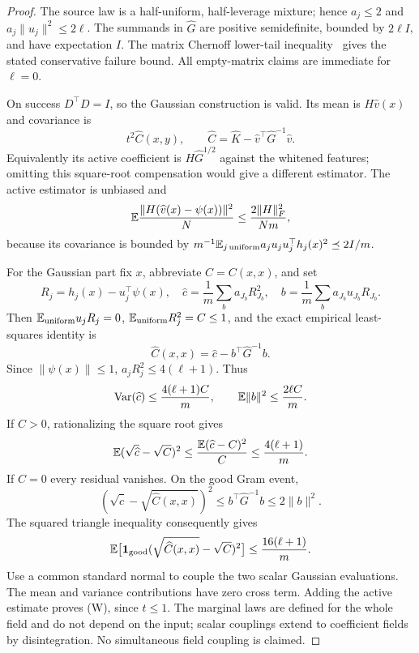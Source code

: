 \begin{proof}
The source law is a half-uniform, half-leverage mixture; hence
$a_j\le2$ and $a_j\|u_j\|^2\le2\ell$. The summands in $\widehat G$ are
positive semidefinite, bounded by $2\ell I$, and have expectation $I$.
The matrix Chernoff lower-tail inequality~\cite{tropp} gives the stated
conservative failure bound. All empty-matrix claims are immediate for
$\ell=0$.

On success $D^\top D=I$, so the Gaussian construction is valid. Its mean
is $H\widehat v(x)$ and covariance is
\[
 t^2\widehat C(x,y),\qquad
 \widehat C=\widehat K-\widehat v^\top\widehat G^{-1}\widehat v.
\]
Equivalently its active coefficient is $H\widehat G^{1/2}$ against the
whitened features; omitting this square-root compensation would give a
different estimator. The active estimator is unbiased and
\[
 \mathbb E\frac{\|H(\widehat v(x)-\psi(x))\|^2}{N}
 \le\frac{2\|H\|_F^2}{Nm},
\]
because its covariance is bounded by
$m^{-1}\mathbb E_{j\,\mathrm{uniform}}a_ju_ju_j^\top h_j(x)^2\preceq2I/m$.

For the Gaussian part fix $x$, abbreviate $C=C(x,x)$, and set
\[
 R_j=h_j(x)-u_j^\top\psi(x),\quad
 \widehat c=\frac1m\sum_ba_{J_b}R_{J_b}^2,\quad
 b=\frac1m\sum_ba_{J_b}u_{J_b}R_{J_b}.
\]
Then $\mathbb E_{\mathrm{uniform}}u_jR_j=0$, $\mathbb E_{\mathrm{uniform}}R_j^2=C\le1$,
and the exact empirical least-squares identity is
\[
 \widehat C(x,x)=\widehat c-b^\top\widehat G^{-1}b.
\]
Since $\|\psi(x)\|\le1$, $a_jR_j^2\le4(\ell+1)$. Thus
\[
 \operatorname{Var}(\widehat c)\le\frac{4(\ell+1)C}{m},\qquad
 \mathbb E\|b\|^2\le\frac{2\ell C}{m}.
\]
If $C>0$, rationalizing the square root gives
\[
 \mathbb E(\sqrt{\widehat c}-\sqrt C)^2
 \le\frac{\mathbb E(\widehat c-C)^2}{C}\le\frac{4(\ell+1)}m.
\]
If $C=0$ every residual vanishes. On the good Gram event,
\[
 (\sqrt{\widehat c}-\sqrt{\widehat C(x,x)})^2
 \le b^\top\widehat G^{-1}b\le2\|b\|^2.
\]
The squared triangle inequality consequently gives
\[
 \mathbb E\bigl[\mathbf1_{\rm good}
       (\sqrt{\widehat C(x,x)}-\sqrt C)^2\bigr]
 \le\frac{16(\ell+1)}m.
\]
Use a common standard normal to couple the two scalar Gaussian evaluations.
The mean and variance contributions have zero cross term. Adding the active
estimate proves (W), since $t\le1$. The marginal laws are defined for the
whole field and do not depend on the input; scalar couplings extend to
coefficient fields by disintegration. No simultaneous field coupling is
claimed.
\end{proof}

